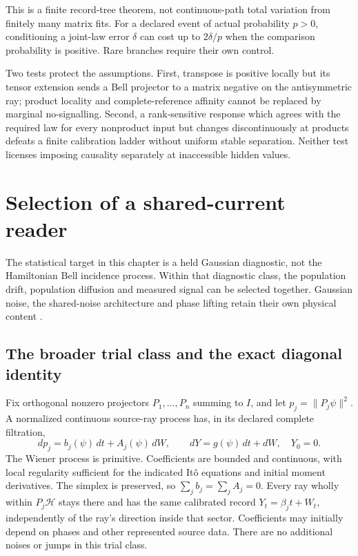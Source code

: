 \documentclass[11pt,oneside,openany]{book}
\theoremstyle{definition}
\theoremstyle{remark}\newtheorem{remark}[theorem]{Remark}
\begin{document}
This is a finite record-tree theorem, not continuous-path total variation from finitely many matrix fits. For a declared event of actual probability $p>0$, conditioning a joint-law error $\delta$ can cost up to $2\delta/p$ when the comparison probability is positive. Rare branches require their own control.

Two tests protect the assumptions. First, transpose is positive locally but its tensor extension sends a Bell projector to a matrix negative on the antisymmetric ray; product locality and complete-reference affinity cannot be replaced by marginal no-signalling. Second, a rank-sensitive response which agrees with the required law for every nonproduct input but changes discontinuously at products defeats a finite calibration ladder without uniform stable separation. Neither test licenses imposing causality separately at inaccessible hidden values.

\chapter{Selection of a shared-current reader}
\label{cpc:chap:selection}

The statistical target in this chapter is a held Gaussian diagnostic, not the Hamiltonian Bell incidence process. Within that diagnostic class, the population drift, population diffusion and measured signal can be selected together. Gaussian noise, the shared-noise architecture and phase lifting retain their own physical content \cite{M13,M14,Filtering}.

\section{The broader trial class and the exact diagonal identity}

Fix orthogonal nonzero projectors $P_1,\ldots,P_n$ summing to $I$, and let $p_j=\|P_j\psi\|^2$. A normalized continuous source-ray process has, in its declared complete filtration,
\begin{equation}
 dp_j=b_j(\psi)\,dt+A_j(\psi)\,dW,\qquad
 dY=g(\psi)\,dt+dW,\quad Y_0=0.
 \label{cpc:eq:trial}
\end{equation}
The Wiener process is primitive. Coefficients are bounded and continuous, with local regularity sufficient for the indicated It\^o equations and initial moment derivatives. The simplex is preserved, so $\sum_j b_j=\sum_j A_j=0$. Every ray wholly within $P_j\mathcal H$ stays there and has the same calibrated record $Y_t=\beta_jt+W_t$, independently of the ray's direction inside that sector. Coefficients may initially depend on phases and other represented source data. There are no additional noises or jumps in this trial class.
\end{document}
